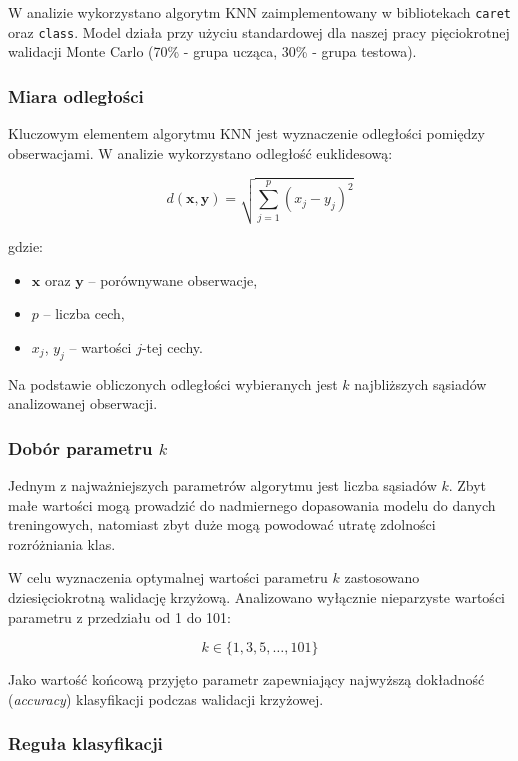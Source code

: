 \documentclass[twoside]{customStyle}
\begin{document}
W analizie wykorzystano algorytm KNN zaimplementowany w bibliotekach \texttt{caret} oraz \texttt{class}. Model działa przy użyciu standardowej dla naszej pracy pięciokrotnej walidacji Monte Carlo (70\% - grupa ucząca, 30\% - grupa testowa).

\subsubsection{Miara odległości}

Kluczowym elementem algorytmu KNN jest wyznaczenie odległości pomiędzy obserwacjami. W analizie wykorzystano odległość euklidesową:

\begin{equation}
d(\mathbf{x}, \mathbf{y}) =
\sqrt{
\sum_{j=1}^{p}
(x_j-y_j)^2
}
\end{equation}

gdzie:
\begin{itemize}
    \item $\mathbf{x}$ oraz $\mathbf{y}$ -- porównywane obserwacje,
    \item $p$ -- liczba cech,
    \item $x_j$, $y_j$ -- wartości $j$-tej cechy.
\end{itemize}

Na podstawie obliczonych odległości wybieranych jest $k$ najbliższych sąsiadów analizowanej obserwacji.

\subsubsection{Dobór parametru \texorpdfstring{$k$}{k}}

Jednym z najważniejszych parametrów algorytmu jest liczba sąsiadów $k$. Zbyt małe wartości mogą prowadzić do nadmiernego dopasowania modelu do danych treningowych, natomiast zbyt duże mogą powodować utratę zdolności rozróżniania klas.

W celu wyznaczenia optymalnej wartości parametru $k$ zastosowano dziesięciokrotną walidację krzyżową. Analizowano wyłącznie nieparzyste wartości parametru z przedziału od 1 do 101:

\[
k \in \{1,3,5,\ldots,101\}
\]

Jako wartość końcową przyjęto parametr zapewniający najwyższą dokładność (\textit{accuracy}) klasyfikacji podczas walidacji krzyżowej.

\subsubsection{Reguła klasyfikacji}
\end{document}
